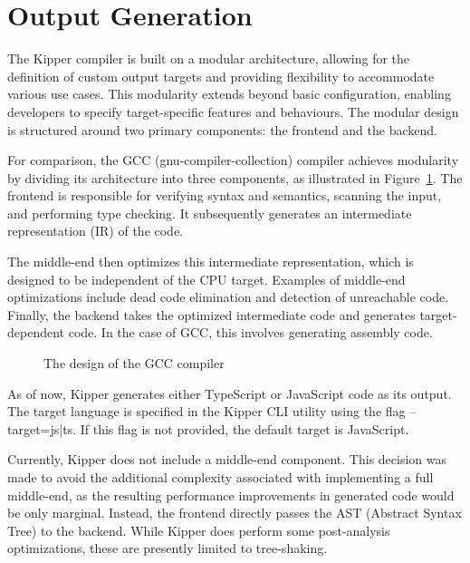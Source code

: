 \section{Output Generation}
\label{sec:output-generation}

The Kipper compiler is built on a modular architecture, allowing for the definition of custom output targets and providing flexibility to accommodate various use cases. This modularity extends beyond basic configuration, enabling developers to specify target-specific features and behaviours. The modular design is structured around two primary components: the frontend and the backend.

For comparison, the GCC (\Gls{gnu-compiler-collection}) compiler achieves modularity by dividing its architecture into three components, as illustrated in Figure~\ref{fig:implementation:gcccompiler}. The frontend is responsible for verifying syntax and semantics, scanning the input, and performing type checking. It subsequently generates an intermediate representation (IR) of the code.

The middle-end then optimizes this intermediate representation, which is designed to be independent of the CPU target. Examples of middle-end optimizations include dead code elimination and detection of unreachable code. Finally, the backend takes the optimized intermediate code and generates target-dependent code. In the case of GCC, this involves generating assembly code.

\begin{figure}[h!]
	\centering
	\def\stackalignment{r}
	\caption{The design of the GCC compiler}
	\label{fig:implementation:gcccompiler}
\end{figure}

As of now, Kipper generates either TypeScript or JavaScript code as its output. The target language is specified in the Kipper CLI utility using the flag --target={js|ts}. If this flag is not provided, the default target is JavaScript.

Currently, Kipper does not include a middle-end component. This decision was made to avoid the additional complexity associated with implementing a full middle-end, as the resulting performance improvements in generated code would be only marginal. Instead, the frontend directly passes the AST (Abstract Syntax Tree) to the backend. While Kipper does perform some post-analysis optimizations, these are presently limited to tree-shaking.

